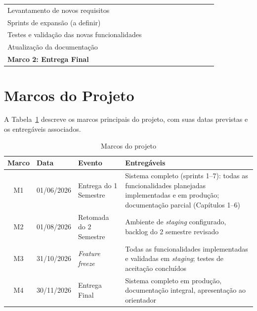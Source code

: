 {\begin{table}[H]
{\begin{tabular}{p{6.2cm}cccccccccc}
    Levantamento de novos requisitos
      & & & & & & \cellcolor{primary!12} & & & & \\
    Sprints de expansão (a definir)
      & & & & & & \cellcolor{primary!12}
      & \cellcolor{primary!12}
      & \cellcolor{primary!12}
      & \cellcolor{primary!12}
      & \\
    Testes e validação das novas funcionalidades
      & & & & & & &
      & \cellcolor{primary!12}
      & \cellcolor{primary!12}
      & \\
    Atualização da documentação
      & & & & & & &
      & \cellcolor{primary!12}
      & \cellcolor{primary!12}
      & \\
    \rowcolor{primary!18}
    \textbf{Marco 2: Entrega Final}
      & & & & & & & & &
      & \cellcolor{primary!70} \\
    \bottomrule
  \end{tabular}}
\end{table}
}

\section{Marcos do Projeto}
\label{sec:milestones}

A Tabela~\ref{tab:milestones} descreve os marcos
principais do projeto, com suas datas previstas
e os entregáveis associados.

\begin{table}[H]
  \centering
  \caption{Marcos do projeto}
  \label{tab:milestones}
  \begin{tabular}{clp{4cm}p{4.5cm}}
    \toprule
    \textbf{Marco} &
    \textbf{Data} &
    \textbf{Evento} &
    \textbf{Entregáveis} \\
    \midrule
    M1 & 01/06/2026
      & Entrega do 1\textordmasculine{} Semestre
      & Sistema completo (sprints 1--7):
        todas as funcionalidades planejadas
        implementadas e em produção;
        documentação parcial (Capítulos 1--6) \\
    \midrule
    M2 & 01/08/2026
      & Retomada do 2\textordmasculine{} Semestre
      & Ambiente de \textit{staging} configurado,
        backlog do 2\textordmasculine{} semestre
        revisado \\
    \midrule
    M3 & 31/10/2026
      & \textit{Feature freeze}
      & Todas as funcionalidades implementadas
        e validadas em \textit{staging}; testes
        de aceitação concluídos \\
    \midrule
    M4 & 30/11/2026
      & Entrega Final
      & Sistema completo em produção,
        documentação integral,
        apresentação ao orientador \\
    \bottomrule
  \end{tabular}
\end{table}
